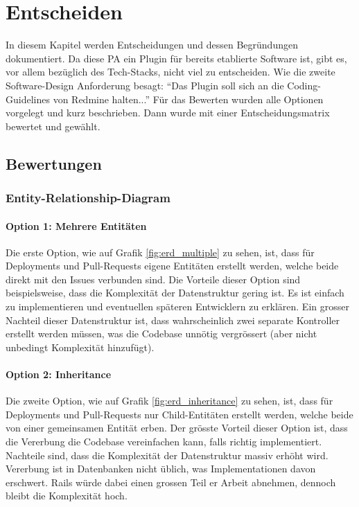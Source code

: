 \chapter{Entscheiden}
\label{chap:decide}
In diesem Kapitel werden Entscheidungen und dessen Begründungen dokumentiert. \newline
Da diese PA ein Plugin für bereits etablierte Software ist, gibt es, vor allem bezüglich des Tech-Stacks, nicht viel zu
entscheiden. Wie die zweite Software-Design Anforderung besagt: \enquote{Das Plugin soll sich an die Coding-Guidelines von
Redmine halten...} \newline
Für das Bewerten wurden alle Optionen vorgelegt und kurz beschrieben. Dann wurde mit einer Entscheidungsmatrix
bewertet und gewählt.

\section{Bewertungen}
\subsection{Entity-Relationship-Diagram}
\subsubsection{Option 1: Mehrere Entitäten}
Die erste Option, wie auf Grafik \ref{fig:erd_multiple} zu sehen, ist, dass für Deployments und Pull-Requests
eigene Entitäten erstellt werden, welche beide direkt mit den Issues verbunden sind. \newline
Die Vorteile dieser Option sind beispielsweise, dass die Komplexität der Datenstruktur gering ist. Es ist einfach zu
implementieren und eventuellen späteren Entwicklern zu erklären. \newline
Ein grosser Nachteil dieser Datenstruktur ist, dass wahrscheinlich zwei separate Kontroller erstellt werden müssen, was
die Codebase unnötig vergrössert (aber nicht unbedingt Komplexität hinzufügt).

\subsubsection{Option 2: Inheritance}
Die zweite Option, wie auf Grafik \ref{fig:erd_inheritance} zu sehen, ist, dass für Deployments und Pull-Requests nur
Child-Entitäten erstellt werden, welche beide von einer gemeinsamen Entität erben. \newline
Der grösste Vorteil dieser Option ist, dass die Vererbung die Codebase vereinfachen kann, falls richtig implementiert.
\newline
Nachteile sind, dass die Komplexität der Datenstruktur massiv erhöht wird. Vererbung ist in Datenbanken nicht üblich, was
Implementationen davon erschwert. Rails würde dabei einen grossen Teil er Arbeit abnehmen, dennoch bleibt die Komplexität
hoch.

